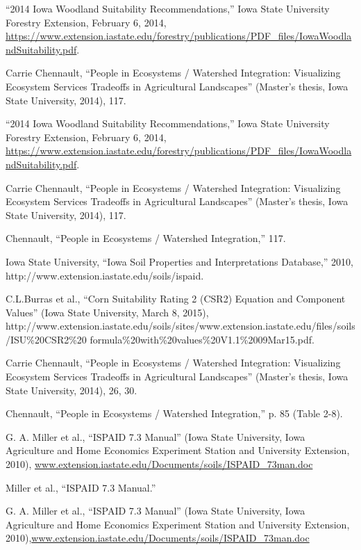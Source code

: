 \documentclass[11pt]{article}
\begin{document}
\begin{thebibliography}{1}
 “2014 Iowa Woodland Suitability Recommendations,” Iowa State University Forestry Extension, February 6, 2014, \url{https://www.extension.iastate.edu/forestry/publications/PDF_files/IowaWoodlandSuitability.pdf}.
  
   Carrie Chennault, “People in Ecosystems / Watershed Integration: Visualizing Ecosystem Services Tradeoffs in Agricultural Landscapes” (Master’s thesis, Iowa State University, 2014), 117.
  
   “2014 Iowa Woodland Suitability Recommendations,” Iowa State University Forestry Extension, February 6, 2014, \url{https://www.extension.iastate.edu/forestry/publications/PDF_files/IowaWoodlandSuitability.pdf}.
  
   Carrie Chennault, “People in Ecosystems / Watershed Integration: Visualizing Ecosystem Services Tradeoffs in Agricultural Landscapes” (Master’s thesis, Iowa State University, 2014), 117.
  
  Chennault, “People in Ecosystems / Watershed Integration,” 117.
  
   Iowa State University, “Iowa Soil Properties and Interpretations Database,” 2010, http://www.extension.iastate.edu/soils/ispaid.
  
   C.L.Burras et al., “Corn Suitability Rating 2 (CSR2) Equation and Component Values” (Iowa State University, March 8, 2015), http://www.extension.iastate.edu/soils/sites/www.extension.iastate.edu/files/soils/ISU\%20CSR2\%20
  formula\%20with\%20values\%20V1.1\%2009Mar15.pdf.
  
   Carrie Chennault, “People in Ecosystems / Watershed Integration: Visualizing Ecosystem Services Tradeoffs in Agricultural Landscapes” (Master’s thesis, Iowa State University, 2014), 26, 30.
  
   Chennault, “People in Ecosystems / Watershed Integration,” p. 85 (Table 2-8).
  
   G. A. Miller et al., “ISPAID 7.3 Manual” (Iowa State University, Iowa Agriculture and Home Economics Experiment Station and University Extension, 2010), \url{www.extension.iastate.edu/Documents/soils/ISPAID_73man.doc}
  
   Miller et al., “ISPAID 7.3 Manual.”
  
  G. A. Miller et al., “ISPAID 7.3 Manual” (Iowa State University, Iowa Agriculture and Home Economics Experiment Station and University Extension, 2010),\url{www.extension.iastate.edu/Documents/soils/ISPAID_73man.doc}
  

\end{thebibliography}
\end{document}
